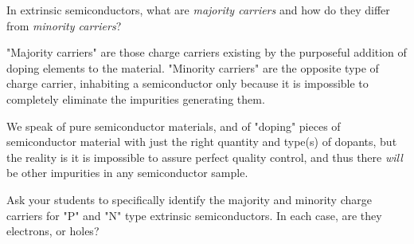 

In extrinsic semiconductors, what are {\it majority carriers} and how do they differ from {\it minority carriers}?







"Majority carriers" are those charge carriers existing by the purposeful addition of doping elements to the material.  "Minority carriers" are the opposite type of charge carrier, inhabiting a semiconductor only because it is impossible to completely eliminate the impurities generating them.







We speak of pure semiconductor materials, and of "doping" pieces of semiconductor material with just the right quantity and type(s) of dopants, but the reality is it is impossible to assure perfect quality control, and thus there {\it will} be other impurities in any semiconductor sample.  

Ask your students to specifically identify the majority and minority charge carriers for "P" and "N" type extrinsic semiconductors.  In each case, are they electrons, or holes?




